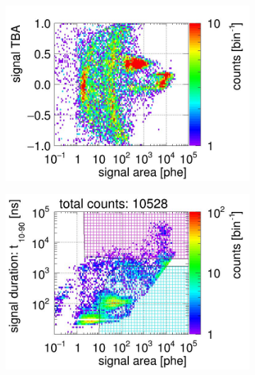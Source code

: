\begin{landscape}
\begin{figure}[!p]
\begin{subfigure}[t]{0.33\textwidth}
			\includegraphics[width=\figurewidth,clip,trim={0 0 0 40}]{Figures/GasTest/CutsValid/res64766/tbapaX23Vecfig64766.jpg}
			\caption{}
			\label{fig:signal selection dv 10 02}
		\end{subfigure}
		\begin{subfigure}[t]{0.33\textwidth}
			\centering
			\includegraphics[width=\figurewidth,clip,trim={0 98 0 0}]{Figures/GasTest/CutsValid/res64766/pdpa26Vecfig64766.jpg}

\end{subfigure}
\end{figure}
\end{landscape}
